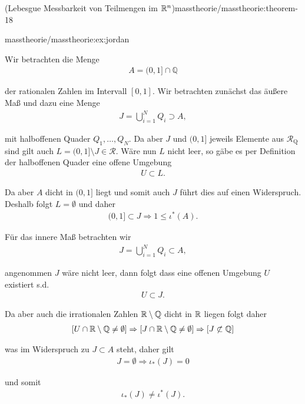\begin{theorem}{(Lebesgue Messbarkeit von Teilmengen im \protect\(\mathbb{R}^n\protect\))}{masstheorie/masstheorie:theorem-18}
\begin{example}{}{masstheorie/masstheorie:ex:jordan}
\par
Wir betrachten die Menge
\begin{align*}
A = (0,1]\cap \mathbb{Q}
\end{align*}
\par
der rationalen Zahlen im Intervall \([0,1]\). Wir betrachten zunächst das äußere Maß und dazu eine Menge
\begin{align*}
J = \bigcup_{i=1}^N Q_i \supset A,
\end{align*}
\par
mit halboffenen Quader \(Q_1,\ldots,Q_N\). Da aber \(J\) und \((0,1]\) jeweils Elemente aus \(\mathcal{R}_{\text{Q}}\) sind gilt auch
\(L = (0,1]\setminus J \in\mathcal{R}\). Wäre nun \(L\) nicht leer, so gäbe es per Definition der halboffenen Quader eine offene Umgebung
\begin{align*}
U\subset L.
\end{align*}
\par
Da aber \(A\) dicht in \((0,1]\) liegt und somit auch \(J\) führt dies auf einen Widerspruch. Deshalb folgt \(L=\emptyset\) und daher
\begin{align*}
(0,1]\subset J \Rightarrow 1\leq \iota^\ast(A).
\end{align*}
\par
Für das innere Maß betrachten wir
\begin{align*}
J = \bigcup_{i=1}^N Q_i \subset A,
\end{align*}
\par
angenommen \(J\) wäre nicht leer, dann folgt dass eine offenen Umgebung \(U\) existiert s.d.
\begin{align*}
U\subset J.
\end{align*}
\par
Da aber auch die irrationalen Zahlen \(\mathbb{R}\setminus \mathbb{Q}\) dicht in \(\mathbb{R}\) liegen folgt daher
\begin{align*}
\left[U\cap\mathbb{R}\setminus \mathbb{Q} \neq \emptyset\right] 
\Rightarrow 
\left[J \cap \mathbb{R}\setminus \mathbb{Q} \neq \emptyset\right]
\Rightarrow 
\left[J\not\subset \mathbb{Q}\right]
\end{align*}
\par
was im Widerspruch zu \(J\subset A\) steht, daher gilt
\begin{align*}
J=\emptyset\Rightarrow \iota_\ast(J) = 0
\end{align*}
\par
und somit
\begin{align*}
\iota_\ast(J) \neq \iota^\ast(J).
\end{align*}\end{example}


\end{theorem}

